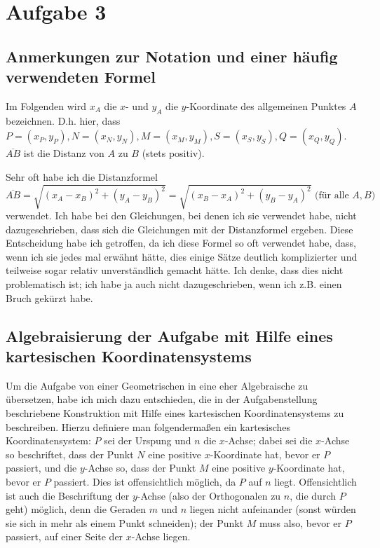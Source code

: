 \section{Aufgabe 3}

\subsection*{Anmerkungen zur Notation und einer häufig verwendeten Formel}

Im Folgenden wird $x_A$ die $x$- und $y_A$ die $y$-Koordinate des allgemeinen Punktes $A$ bezeichnen. D.h. hier, dass 
$P=(x_P, y_P), N=(x_N, y_N), M=(x_M, y_M), S=(x_S, y_S), Q=(x_Q, y_Q)$.\\
$\overline{AB}$ ist die Distanz von $A$ zu $B$ (stets positiv).

Sehr oft habe ich die Distanzformel 
\[\overline{AB}=\sqrt{(x_A-x_B)^2+(y_A-y_B)^2}=\sqrt{(x_B-x_A)^2+(y_B-y_A)^2}\text{    (für alle $A,B$)}\] 
verwendet. Ich habe bei den Gleichungen, bei denen ich sie verwendet habe, nicht dazugeschrieben, dass sich die 
Gleichungen mit der Distanzformel ergeben. Diese Entscheidung habe ich getroffen, da ich diese Formel so oft verwendet 
habe, dass, wenn ich sie jedes mal erwähnt hätte, dies einige Sätze deutlich komplizierter und teilweise sogar 
relativ unverständlich gemacht hätte. Ich denke, dass dies nicht problematisch ist; ich habe ja auch nicht dazugeschrieben, 
wenn ich z.B. einen Bruch gekürzt habe.

\subsection*{Algebraisierung der Aufgabe mit Hilfe eines kartesischen Koordinatensystems}

Um die Aufgabe von einer Geometrischen in eine eher Algebraische zu übersetzen, habe ich mich dazu entschieden, die 
in der Aufgabenstellung beschriebene Konstruktion mit Hilfe eines kartesischen Koordinatensystems zu beschreiben. 
Hierzu definiere man folgendermaßen ein kartesisches Koordinatensystem: $P$ sei der Urspung und $n$ die $x$-Achse; 
dabei sei die $x$-Achse so beschriftet, dass der Punkt $N$ eine positive $x$-Koordinate hat, bevor er $P$ passiert, 
und die $y$-Achse so, dass der Punkt $M$ eine positive $y$-Koordinate hat, bevor er $P$ passiert. Dies ist 
offensichtlich möglich, da $P$ auf $n$ liegt. Offensichtlich ist auch die Beschriftung der $y$-Achse (also der 
Orthogonalen zu $n$, die durch $P$ geht) möglich, denn die Geraden $m$ und $n$ liegen nicht aufeinander (sonst 
würden sie sich in mehr als einem Punkt schneiden); der Punkt $M$ muss also, bevor er $P$ passiert, auf einer Seite 
der $x$-Achse liegen.

